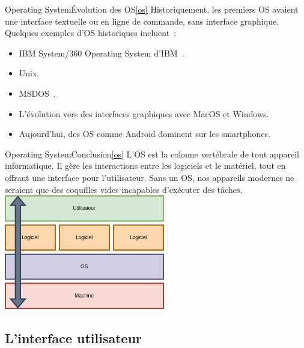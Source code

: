 \documentclass{beamer}
\begin{document}
    \begin{frame}{Operating System}{Évolution des OS\cref{os}}
        Historiquement, les premiers OS avaient une interface textuelle ou en ligne de commande, sans interface graphique.
        Quelques exemples d'OS historiques incluent~:
        \begin{itemize}
            \item IBM System/360 Operating System d'IBM~.
            \item Unix.
            \item MSDOS~.
            \item L'évolution vers des interfaces graphiques avec MacOS et Windows.
            \item Aujourd'hui, des OS comme Android dominent sur les smartphones.
        \end{itemize}
    \end{frame}

    \begin{frame}{Operating System}{Conclusion\cref{os}}
        L'OS est la colonne vertébrale de tout appareil informatique.
        Il gère les interactions entre les logiciels et le matériel, tout en offrant une interface pour l'utilisateur.
        Sans un OS, nos appareils modernes ne seraient que des coquilles vides incapables d'exécuter des tâches.
        \bigbreak
        \centering
        \includegraphics[width=7cm]{image/os.drawio}
    \end{frame}

    \subsection{L'interface utilisateur}\label{subsec:hmi}
\end{document}

